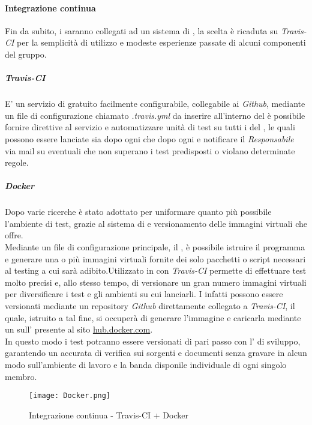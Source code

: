 \documentclass{scalatekids-article}
\begin{document}
\paragraph{Integrazione continua}
Fin da subito, i  saranno collegati ad un sistema di
, la scelta è ricaduta su \textit{Travis-CI} per la
semplicità di utilizzo e modeste esperienze passate di alcuni componenti del
gruppo.
\subparagraph{Travis-CI}
E' un servizio di  gratuito facilmente
configurabile, collegabile ai  \textit{Github}, mediante un
file di configurazione chiamato \textit{.travis.yml} da inserire all'interno del
 è possibile fornire direttive al servizio e automatizzare
unità di test su tutti i  del , le quali possono
essere lanciate sia dopo ogni  che dopo ogni  e
notificare il \textit{Responsabile} via mail su eventuali  che non
superano i test predisposti o violano determinate regole.
\subparagraph{Docker}
Dopo varie ricerche  è stato adottato per uniformare quanto più
possibile l'ambiente di test, grazie al sistema di  e
versionamento delle immagini virtuali che offre.\\ Mediante un file di
configurazione principale, il , è possibile istruire il
programma e generare una o più immagini virtuali fornite dei solo pacchetti o
script necessari al testing a cui sarà adibito.Utilizzato in  con
\textit{Travis-CI} permette di effettuare test molto precisi e, allo stesso
tempo, di versionare un gran numero immagini virtuali per diversificare i test e
gli ambienti su cui lanciarli. I  infatti possono essere
versionati mediante un repository \textit{Github} direttamente collegato a
\textit{Travis-CI}, il quale, istruito a tal fine, si occuperà di generare
l'immagine  e caricarla mediante un  sull'
 presente al sito \url{hub.docker.com}.\\ In questo modo i test
potranno essere versionati di pari passo con l' di sviluppo, garantendo
un accurata  di verifica sui sorgenti e documenti senza gravare in alcun
modo sull'ambiente di lavoro e la banda disponile individuale di ogni singolo
membro.
\begin{figure}[H]
  \centering
  \texttt{[image: Docker.png]}
  \caption{Integrazione continua - Travis-CI + Docker}
\end{figure}
\end{document}
